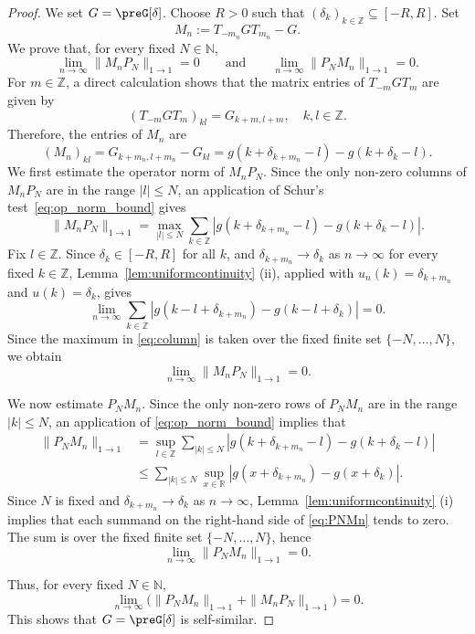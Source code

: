 \documentclass[reqno,a4paper,12pt]{amsart}
\numberwithin{equation}{section}
\def\Z{{\mathbb Z}}
\newcommand\1{\mathds{1}}
\begin{document}
\begin{proof}
We set $G = \preG[\delta]$.
  Choose $R>0$ such that $ (\delta_k)_{k\in\Z}  \subseteq [-R,R]$.
Set
$$
M_n:=T_{-m_n}GT_{m_n}-G .
$$
We prove that, for every fixed $N\in\mathbb N$,
$$
\lim_{n\to\infty}\|M_nP_N\|_{1\to1}=0
\qquad\text{and}\qquad
\lim_{n\to\infty}\|P_NM_n\|_{1\to1}=0.
$$
For $m\in\mathbb Z$, a direct calculation shows that the matrix entries of $T_{-m}GT_m$ are given by
$$
(T_{-m}GT_m)_{kl}=G_{k+m,l+m},\quad k,l\in\Z.
$$
Therefore, the entries of $M_n$ are
$$
(M_n)_{kl}
=
G_{k+m_n,l+m_n}-G_{kl}
=
g(k+\delta_{k+m_n}-l)-g(k+\delta_k-l).
$$
We first estimate the operator norm of 
 $M_nP_N$. 
Since the only non-zero columns of $M_nP_N$ are in the range
$|l|\leq N$, 
an application of Schur's test~\eqref{eq:op_norm_bound}
gives
\begin{equation}\label{eq:column}
    \|M_nP_N\|_{1\to1}
=
\max_{|l|\leq N}
\sum_{k\in\mathbb Z}
\left|
g(k+\delta_{k+m_n}-l)-g(k+\delta_k-l)
\right|.
\end{equation}
Fix $l\in\mathbb Z$. Since $\delta_k\in  [-R,R]$ for all
$k$, and
$
\delta_{k+m_n}\to\delta_k$ as $n\to\infty$
for every fixed $k\in\mathbb Z$, Lemma~\ref{lem:uniformcontinuity}
\textup{(ii)}, applied with $u_n(k)=\delta_{k+m_n}$  and
$u(k)=\delta_k$, gives
$$
\lim_{n\to\infty}
\sum_{k\in\mathbb Z}
\left|
g(k-l+\delta_{k+m_n})-g(k-l+\delta_k)
\right|
=0.
$$
Since the maximum in \eqref{eq:column} is taken over the fixed finite set $\{-N,\dots, N\}$, we obtain
$$
\lim_{n\to\infty}\|M_nP_N\|_{1\to1}=0.
$$

We now estimate
$P_NM_n$. 
Since the only non-zero rows of $P_NM_n$ are in the range
$|k|\leq N$, 
an application of 
\eqref{eq:op_norm_bound}
implies that
\begin{equation}\label{eq:PNMn}
\begin{split}
    \|P_N M_n\|_{1\to1}
&=
\sup_{l\in\mathbb Z}
\sum_{|k|\leq N}
\left|
g(k+\delta_{k+m_n}-l)-g(k+\delta_k-l)
\right| \\
&\leq \sum _{|k|\leq N}  \sup_{x\in\mathbb R}
\left|
g(x+\delta_{k+m_n})-g(x+\delta_k)
\right|. 
\end{split}
\end{equation}
Since $N$ is fixed
and $
\delta_{k+m_n}\to\delta_k
$
as $n \to \infty$, %
Lemma~\ref{lem:uniformcontinuity}
\textup{(i)}  implies that each summand 
on the right-hand side of \eqref{eq:PNMn} tends
to zero. The sum is over the fixed finite set $\{-N, \dots, N\}$, hence
$$
\lim_{n\to\infty}\|P_N M_n\|_{1\to1}=0.
$$

Thus, for every fixed $N\in\mathbb N$,
$$
\lim_{n\to\infty}
\bigl(\|P_N M_n\|_{1\to1}+\|M_nP_N\|_{1\to1}\bigr)=0.
$$
This shows that $G=\preG[\delta]$ is self-similar.
\end{proof}
\end{document}
